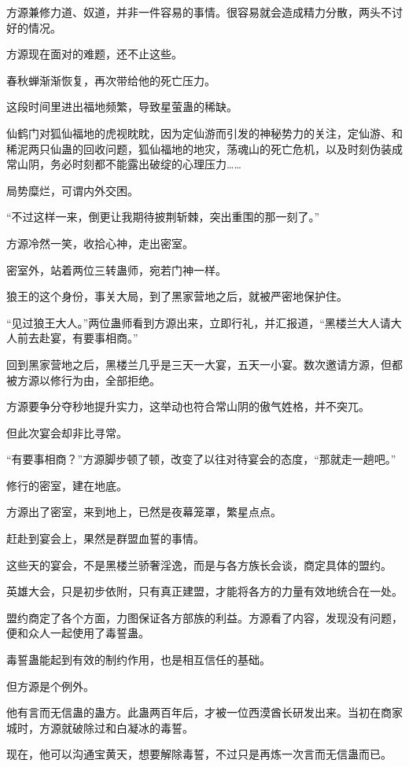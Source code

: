 \begin{this_body}
方源兼修力道、奴道，并非一件容易的事情。很容易就会造成精力分散，两头不讨好的情况。

方源现在面对的难题，还不止这些。

春秋蝉渐渐恢复，再次带给他的死亡压力。

这段时间里进出福地频繁，导致星萤蛊的稀缺。

仙鹤门对狐仙福地的虎视眈眈，因为定仙游而引发的神秘势力的关注，定仙游、和稀泥两只仙蛊的回收问题，狐仙福地的地灾，荡魂山的死亡危机，以及时刻伪装成常山阴，务必时刻都不能露出破绽的心理压力……

局势糜烂，可谓内外交困。

“不过这样一来，倒更让我期待披荆斩棘，突出重围的那一刻了。”

方源冷然一笑，收拾心神，走出密室。

密室外，站着两位三转蛊师，宛若门神一样。

狼王的这个身份，事关大局，到了黑家营地之后，就被严密地保护住。

“见过狼王大人。”两位蛊师看到方源出来，立即行礼，并汇报道，“黑楼兰大人请大人前去赴宴，有要事相商。”

回到黑家营地之后，黑楼兰几乎是三天一大宴，五天一小宴。数次邀请方源，但都被方源以修行为由，全部拒绝。

方源要争分夺秒地提升实力，这举动也符合常山阴的傲气姓格，并不突兀。

但此次宴会却非比寻常。

“有要事相商？”方源脚步顿了顿，改变了以往对待宴会的态度，“那就走一趟吧。”

修行的密室，建在地底。

方源出了密室，来到地上，已然是夜幕笼罩，繁星点点。

赶赴到宴会上，果然是群盟血誓的事情。

这些天的宴会，不是黑楼兰骄奢淫逸，而是与各方族长会谈，商定具体的盟约。

英雄大会，只是初步依附，只有真正建盟，才能将各方的力量有效地统合在一处。

盟约商定了各个方面，力图保证各方部族的利益。方源看了内容，发现没有问题，便和众人一起使用了毒誓蛊。

毒誓蛊能起到有效的制约作用，也是相互信任的基础。

但方源是个例外。

他有言而无信蛊的蛊方。此蛊两百年后，才被一位西漠酋长研发出来。当初在商家城时，方源就破除过和白凝冰的毒誓。

现在，他可以沟通宝黄天，想要解除毒誓，不过只是再炼一次言而无信蛊而已。


\end{this_body}
